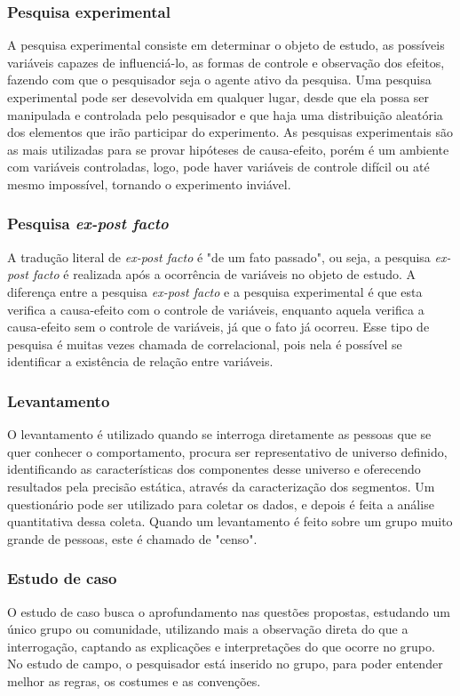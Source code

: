 \subsubsection{Pesquisa experimental}
	A pesquisa experimental consiste em determinar o objeto de estudo, as possíveis variáveis capazes de influenciá-lo, as formas de controle e observação dos efeitos, fazendo com que o pesquisador seja o agente ativo da pesquisa. Uma pesquisa experimental pode ser desevolvida em qualquer lugar, desde que ela possa ser manipulada e controlada pelo pesquisador e que haja uma distribuição aleatória dos elementos que irão participar do experimento. As pesquisas experimentais são as mais utilizadas para se provar hipóteses de causa-efeito, porém é um ambiente com variáveis controladas, logo, pode haver variáveis de controle difícil ou até mesmo impossível, tornando o experimento inviável. \cite{ac2002elaborar}
\subsubsection{Pesquisa \textit{ex-post facto}}
	A tradução literal de \textit{ex-post facto} é "de um fato passado", ou seja, a pesquisa \textit{ex-post facto} é realizada após a ocorrência de variáveis no objeto de estudo. A diferença entre a pesquisa \textit{ex-post facto} e a pesquisa experimental é que esta verifica a causa-efeito com o controle de variáveis, enquanto aquela verifica a causa-efeito sem o controle de variáveis, já que o fato já ocorreu. Esse tipo de pesquisa é muitas vezes chamada de correlacional, pois nela é possível se identificar a existência de relação entre variáveis. \cite{ac2002elaborar}
\subsubsection{Levantamento}
	O levantamento é utilizado quando se interroga diretamente as pessoas que se quer conhecer o comportamento, procura ser representativo de universo definido, identificando as características dos componentes desse universo e oferecendo resultados pela precisão estática, através da caracterização dos segmentos. Um questionário pode ser utilizado para coletar os dados, e depois é feita a análise quantitativa dessa coleta. Quando um levantamento é feito sobre um grupo muito grande de pessoas, este é chamado de "censo". \cite{prodanov2013metodologia} 	
\subsubsection{Estudo de caso}
		O estudo de caso busca o aprofundamento nas questões propostas, estudando um único grupo ou comunidade, utilizando mais a observação direta do que a interrogação, captando as explicações e interpretações do que ocorre no grupo. No estudo de campo, o pesquisador está inserido no grupo, para poder entender melhor as regras, os costumes e as convenções.


